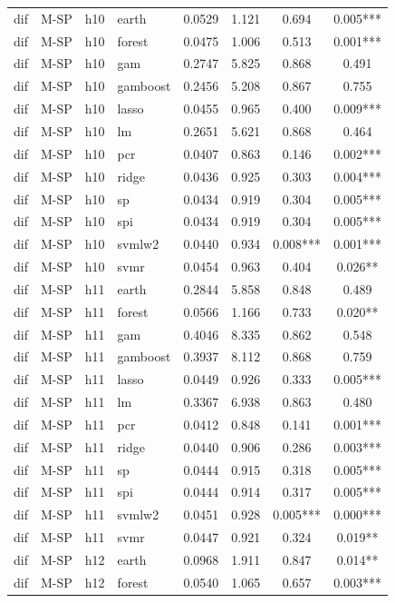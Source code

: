\begin{ThreePartTable}
\begin{longtable}[t]{llclcccc}
\addlinespace
dif & M-SP & h10 & earth & 0.0529 & 1.121 & 0.694 & 0.005***\\
dif & M-SP & h10 & forest & 0.0475 & 1.006 & 0.513 & 0.001***\\
dif & M-SP & h10 & gam & 0.2747 & 5.825 & 0.868 & 0.491\\
dif & M-SP & h10 & gamboost & 0.2456 & 5.208 & 0.867 & 0.755\\
dif & M-SP & h10 & lasso & 0.0455 & 0.965 & 0.400 & 0.009***\\
dif & M-SP & h10 & lm & 0.2651 & 5.621 & 0.868 & 0.464\\
dif & M-SP & h10 & pcr & 0.0407 & 0.863 & 0.146 & 0.002***\\
dif & M-SP & h10 & ridge & 0.0436 & 0.925 & 0.303 & 0.004***\\
dif & M-SP & h10 & sp & 0.0434 & 0.919 & 0.304 & 0.005***\\
dif & M-SP & h10 & spi & 0.0434 & 0.919 & 0.304 & 0.005***\\
dif & M-SP & h10 & svmlw2 & 0.0440 & 0.934 & 0.008*** & 0.001***\\
dif & M-SP & h10 & svmr & 0.0454 & 0.963 & 0.404 & 0.026**\\
\addlinespace
dif & M-SP & h11 & earth & 0.2844 & 5.858 & 0.848 & 0.489\\
dif & M-SP & h11 & forest & 0.0566 & 1.166 & 0.733 & 0.020**\\
dif & M-SP & h11 & gam & 0.4046 & 8.335 & 0.862 & 0.548\\
dif & M-SP & h11 & gamboost & 0.3937 & 8.112 & 0.868 & 0.759\\
dif & M-SP & h11 & lasso & 0.0449 & 0.926 & 0.333 & 0.005***\\
dif & M-SP & h11 & lm & 0.3367 & 6.938 & 0.863 & 0.480\\
dif & M-SP & h11 & pcr & 0.0412 & 0.848 & 0.141 & 0.001***\\
dif & M-SP & h11 & ridge & 0.0440 & 0.906 & 0.286 & 0.003***\\
dif & M-SP & h11 & sp & 0.0444 & 0.915 & 0.318 & 0.005***\\
dif & M-SP & h11 & spi & 0.0444 & 0.914 & 0.317 & 0.005***\\
dif & M-SP & h11 & svmlw2 & 0.0451 & 0.928 & 0.005*** & 0.000***\\
dif & M-SP & h11 & svmr & 0.0447 & 0.921 & 0.324 & 0.019**\\
\addlinespace
dif & M-SP & h12 & earth & 0.0968 & 1.911 & 0.847 & 0.014**\\
dif & M-SP & h12 & forest & 0.0540 & 1.065 & 0.657 & 0.003***\\

\end{longtable}
\end{ThreePartTable}
